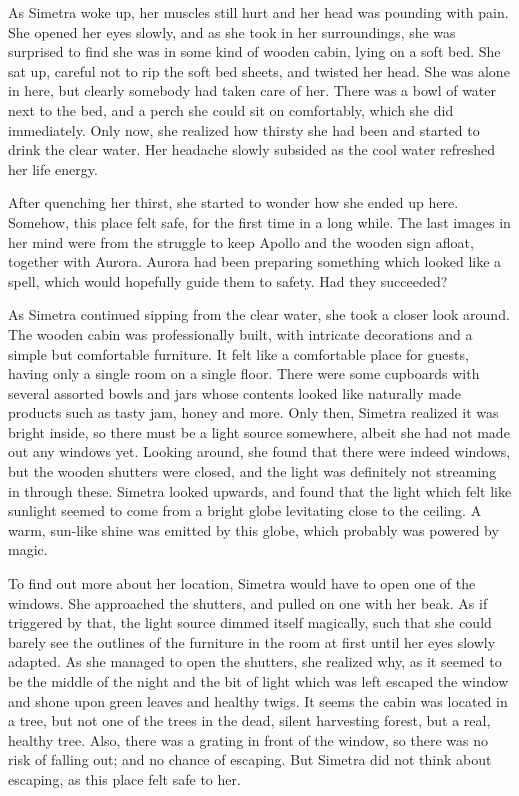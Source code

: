\fancybreaker{}

As Simetra woke up, her muscles still hurt and her head was pounding with pain. She opened her eyes slowly, and as she took in her surroundings, she was surprised to find she was in some kind of wooden cabin, lying on a soft bed. She sat up, careful not to rip the soft bed sheets, and twisted her head. She was alone in here, but clearly somebody had taken care of her. There was a bowl of water next to the bed, and a perch she could sit on comfortably, which she did immediately. Only now, she realized how thirsty she had been and started to drink the clear water. Her headache slowly subsided as the cool water refreshed her life energy.

After quenching her thirst, she started to wonder how she ended up here. Somehow, this place felt safe, for the first time in a long while. The last images in her mind were from the struggle to keep Apollo and the wooden sign afloat, together with Aurora. Aurora had been preparing something which looked like a spell, which would hopefully guide them to safety. Had they succeeded?

As Simetra continued sipping from the clear water, she took a closer look around. The wooden cabin was professionally built, with intricate decorations and a simple but comfortable furniture. It felt like a comfortable place for guests, having only a single room on a single floor. There were some cupboards with several assorted bowls and jars whose contents looked like naturally made products such as tasty jam, honey and more. Only then, Simetra realized it was bright inside, so there must be a light source somewhere, albeit she had not made out any windows yet. Looking around, she found that there were indeed windows, but the wooden shutters were closed, and the light was definitely not streaming in through these. Simetra looked upwards, and found that the light which felt like sunlight seemed to come from a bright globe levitating close to the ceiling. A warm, sun-like shine was emitted by this globe, which probably was powered by magic.

To find out more about her location, Simetra would have to open one of the windows. She approached the shutters, and pulled on one with her beak. As if triggered by that, the light source dimmed itself magically, such that she could barely see the outlines of the furniture in the room at first until her eyes slowly adapted. As she managed to open the shutters, she realized why, as it seemed to be the middle of the night and the bit of light which was left escaped the window and shone upon green leaves and healthy twigs. It seems the cabin was located in a tree, but not one of the trees in the dead, silent harvesting forest, but a real, healthy tree. Also, there was a grating in front of the window, so there was no risk of falling out; and no chance of escaping. But Simetra did not think about escaping, as this place felt safe to her.

